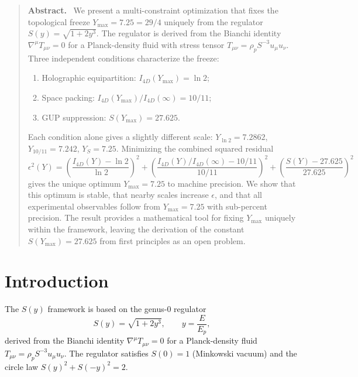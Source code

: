 \documentclass[12pt,oneside,openany]{book}
\newenvironment{abstract}
  {\begin{quote}\small\noindent\textbf{Abstract.}\ }
  {\end{quote}}
\begin{document}
\begin{abstract}
We present a multi-constraint optimization that fixes the topological freeze
\(Y_{\max} = 7.25 = 29/4\) uniquely from the regulator \(S(y) = \sqrt{1+2y^3}\).
The regulator is derived from the Bianchi identity \(\nabla^\mu T_{\mu\nu} = 0\)
for a Planck-density fluid with stress tensor \(T_{\mu\nu} = \rho_p S^{-3}u_\mu u_\nu\).
Three independent conditions characterize the freeze:
\begin{enumerate}
\item Holographic equipartition: \(I_{4D}(Y_{\max}) = \ln 2\);
\item Space packing: \(I_{4D}(Y_{\max})/I_{4D}(\infty) = 10/11\);
\item GUP suppression: \(S(Y_{\max}) = 27.625\).
\end{enumerate}
Each condition alone gives a slightly different scale:
\(Y_{\ln 2} = 7.2862\), \(Y_{10/11} = 7.242\), \(Y_{S} = 7.25\).
Minimizing the combined squared residual
\[
\epsilon^2(Y) = \left(\frac{I_{4D}(Y) - \ln 2}{\ln 2}\right)^2
+ \left(\frac{I_{4D}(Y)/I_{4D}(\infty) - 10/11}{10/11}\right)^2
+ \left(\frac{S(Y) - 27.625}{27.625}\right)^2
\]
gives the unique optimum \(Y_{\max} = 7.25\) to machine precision.
We show that this optimum is stable, that nearby scales increase \(\epsilon\),
and that all experimental observables follow from \(Y_{\max} = 7.25\) with sub-percent precision.
The result provides a mathematical tool for fixing \(Y_{\max}\) uniquely within the framework,
leaving the derivation of the constant \(S(Y_{\max}) = 27.625\) from first principles as an open problem.


\end{abstract}
\section{Introduction}

The \(S(y)\) framework is based on the genus-\(0\) regulator
\begin{equation}
S(y) = \sqrt{1 + 2y^3}, \qquad y = \frac{E}{E_p},
\label{eq:S}
\end{equation}
derived from the Bianchi identity \(\nabla^\mu T_{\mu\nu} = 0\) for a Planck-density fluid
\(T_{\mu\nu} = \rho_p S^{-3}u_\mu u_\nu\).
The regulator satisfies \(S(0) = 1\) (Minkowski vacuum) and the circle law
\(S(y)^2 + S(-y)^2 = 2\).
\end{document}
